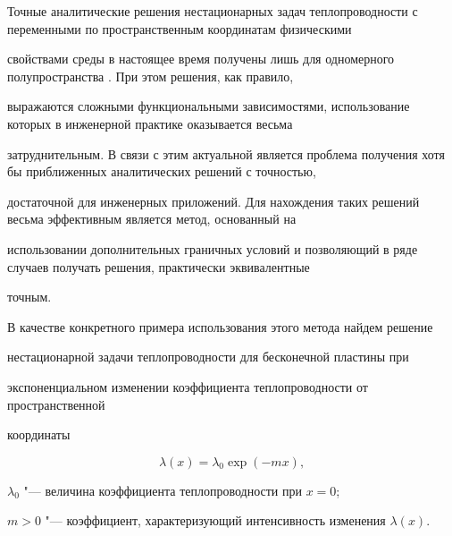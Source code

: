 


\date{28/VI/2010}






\maketitle  \small



Точные аналитические решения нестационарных задач теплопроводности с переменными по пространственным координатам физическими

свойствами среды в настоящее время получены лишь для одномерного полупространства \cite{larg10:1}. При этом решения, как правило,

выражаются сложными функциональными зависимостями, использование которых в инженерной практике оказывается весьма

затруднительным. В связи с этим актуальной является проблема получения хотя бы приближенных аналитических решений с точностью,

достаточной для инженерных приложений. Для нахождения таких решений весьма эффективным является метод, основанный на

использовании дополнительных граничных условий \cite{larg10:2,larg10:3} и позволяющий в ряде случаев получать решения, практически эквивалентные

точным.



В качестве конкретного примера использования этого метода найдем решение

нестационарной задачи теплопроводности для бесконечной пластины при

экспоненциальном изменении коэффициента теплопроводности от пространственной

координаты

\begin{equation}

\label{larg10:eq1}

\lambda (x)=\lambda_0 \exp (-mx),

\end{equation}

$\lambda_0$ "--- величина коэффициента теплопроводности при $x=0$;

$m>0$ "--- коэффициент, характеризующий интенсивность изменения $\lambda (x)$.



